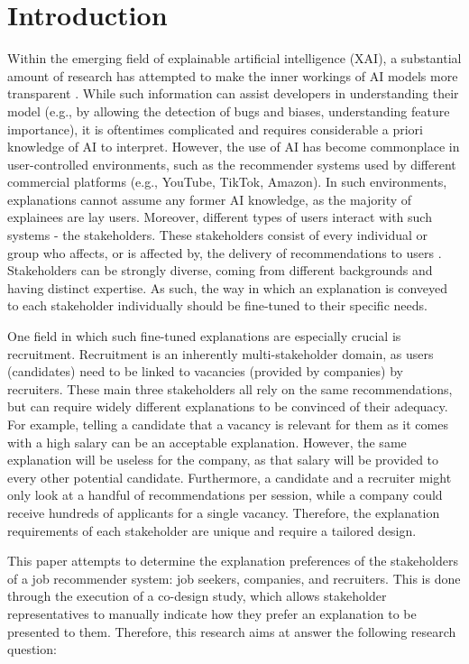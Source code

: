 \section{Introduction}
Within the emerging field of explainable artificial intelligence (XAI), a substantial amount of research has attempted to make the inner workings of AI models more transparent \cite{hagras2018toward,mei2023users}. While such information can assist developers in understanding their model (e.g., by allowing the detection of bugs and biases, understanding feature importance), it is oftentimes complicated and requires considerable a priori knowledge of AI to interpret. However, the use of AI has become commonplace in user-controlled environments, such as the recommender systems used by different commercial platforms (e.g., YouTube, TikTok, Amazon). In such environments, explanations cannot assume any former AI knowledge, as the majority of explainees are lay users. Moreover, different types of users interact with such systems - the stakeholders. These stakeholders consist of every individual or group who affects, or is affected by, the delivery of recommendations to users \cite{abdollahpouri2020multistakeholder}. Stakeholders can be strongly diverse, coming from different backgrounds and having distinct expertise. As such, the way in which an explanation is conveyed to each stakeholder individually should be fine-tuned to their specific needs. 

One field in which such fine-tuned explanations are especially crucial is recruitment. Recruitment is an inherently multi-stakeholder domain, as users (candidates) need to be linked to vacancies (provided by companies) by recruiters. These main three stakeholders all rely on the same recommendations, but can require widely different explanations to be convinced of their adequacy. For example, telling a candidate that a vacancy is relevant for them as it comes with a high salary can be an acceptable explanation. However, the same explanation will be useless for the company, as that salary will be provided to every other potential candidate. Furthermore, a candidate and a recruiter might only look at a handful of recommendations per session, while a company could receive hundreds of applicants for a single vacancy. Therefore, the explanation requirements of each stakeholder are unique and require a tailored design. 

This paper attempts to determine the explanation preferences of the stakeholders of a job recommender system: job seekers, companies, and recruiters. This is done through the execution of a co-design study, which allows stakeholder representatives to manually indicate how they prefer an explanation to be presented to them. Therefore, this research aims at answer the following research question: 

